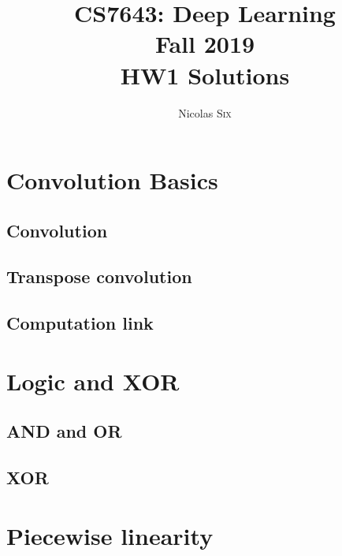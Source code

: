 \documentclass[11pt,english]{article}
\begin{document}
    \title{CS7643: Deep Learning \\
    Fall 2019\\ HW1 Solutions}
    \author{Nicolas \textsc{Six}}
    \maketitle



    \section{Convolution Basics}

    \subsection{Convolution} \label{1.1}
    

    \pagebreak
    \subsection{Transpose convolution} \label{1.2}
    

    \pagebreak
    \subsection{Computation link} \label{1.3}
    

    \pagebreak
    \section{Logic and XOR}
    \subsection{AND and OR} \label{2.1}
    

    \pagebreak
    \subsection{XOR} \label{2.2}
    

    \pagebreak
    \section{Piecewise linearity}
\end{document}
